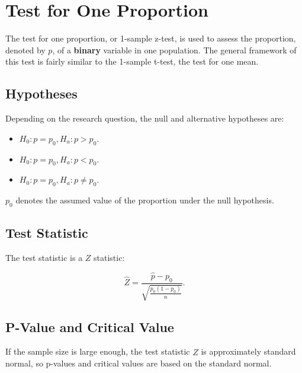 \documentclass[
]{book}
\providecommand{\tightlist}{%
  \setlength{\itemsep}{0pt}\setlength{\parskip}{0pt}}
\theoremstyle{definition}
\theoremstyle{definition}
\theoremstyle{definition}
\theoremstyle{definition}
\theoremstyle{remark}
\begin{document}
\hypertarget{test-for-one-proportion}{%
\section{Test for One Proportion}\label{test-for-one-proportion}}

The test for one proportion, or 1-sample z-test, is used to assess the proportion, denoted by \(p\), of a \textbf{binary} variable in one population. The general framework of this test is fairly similar to the 1-sample t-test, the test for one mean.

\hypertarget{hypotheses-3}{%
\subsection{Hypotheses}\label{hypotheses-3}}

Depending on the research question, the null and alternative hypotheses are:

\begin{itemize}
\tightlist
\item
  \(H_0: p = p_0, H_a: p > p_0\).
\item
  \(H_0: p = p_0, H_a: p < p_0\).
\item
  \(H_0: p = p_0, H_a: p \neq p_0\).
\end{itemize}

\(p_0\) denotes the assumed value of the proportion under the null hypothesis.

\hypertarget{test-statistic-5}{%
\subsection{Test Statistic}\label{test-statistic-5}}

The test statistic is a \(Z\) statistic:

\begin{equation} 
\hat{Z} =  \frac{\hat{p} - p_0}{\sqrt{\frac{p_0(1- p_0)}{n}}}.
\label{eq:teststatProp}
\end{equation}

\hypertarget{p-value-and-critical-value-2}{%
\subsection{P-Value and Critical Value}\label{p-value-and-critical-value-2}}

If the sample size is large enough, the test statistic \(\hat{Z}\) is approximately standard normal, so p-values and critical values are based on the standard normal.
\end{document}
